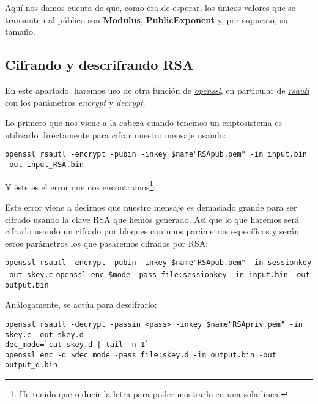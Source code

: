 \documentclass[a4paper, 11pt]{article}
\begin{document}
		Aquí nos damos cuenta de que, como era de esperar, los únicos valores que se transmiten al público son \textbf{Modulus},
		\textbf{PublicExponent} y, por supuesto, su tamaño.
		
	\subsection{Cifrando y descrifrando RSA}
		En este apartado, haremos uso de otra función de \href{http://manpages.ubuntu.com/manpages/zesty/en/man1/openssl.1ssl.html}
		{\textit{openssl}}, en particular de \href{https://www.openssl.org/docs/man1.0.2/apps/rsautl.html}{\textit{rsautl}} con
		los parámetros \textit{encrypt} y \textit{decrypt}.
	
		Lo primero que nos viene a la cabeza cuando tenemos un criptosistema es utilizarlo directamente para cifrar nuestro
		mensaje usando: \\
		\begin{small}
			\verb|openssl rsautl -encrypt -pubin -inkey $name"RSApub.pem" -in input.bin -out input_RSA.bin|
		\end{small}	
		
		Y éste es el error que nos encontramos\footnote{He tenido que reducir la letra para poder mostrarlo en una sola línea.}:
		
		
		Este error viene a decirnos que nuestro mensaje es demasiado grande para ser cifrado usando la clave RSA que hemos
		generado. Así que lo que haremos será cifrarlo usando un cifrado por bloques con unos parámetros específicos y serán
		estos parámetros los que pasaremos cifrados por RSA:
		
		\begin{small}
			\verb|openssl rsautl -encrypt -pubin -inkey $name"RSApub.pem" -in sessionkey -out skey.c|
			\verb|openssl enc $mode -pass file:sessionkey -in input.bin -out output.bin|
		\end{small}
		
		Análogamente, se actúa para descifrarlo:
		
		\begin{small}
			\verb|openssl rsautl -decrypt -passin <pass> -inkey $name"RSApriv.pem" -in skey.c -out skey.d| \\
			\verb!dec_mode=`cat skey.d | tail -n 1`! \\
			\verb|openssl enc -d $dec_mode -pass file:skey.d -in output.bin -out output_d.bin|
		\end{small}
		
\end{document}
